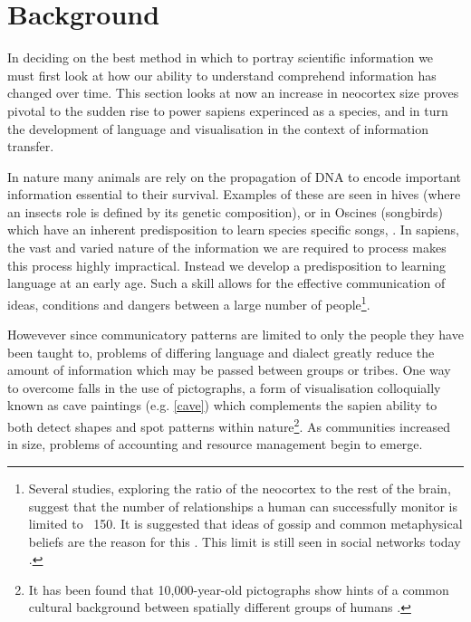 

\section{Background}\label{sec:visbg}

In deciding on the best method in which to portray scientific information we must first look at how our ability to understand comprehend information has changed over time. This section looks at now an increase in neocortex size proves pivotal to the sudden rise to power sapiens experinced as a species, and in turn the development of language and visualisation in the context of information transfer. 

In nature many animals are rely on the propagation of DNA to encode important information essential to their survival. Examples of these are seen in hives (where an insects role is defined by its genetic composition), or in Oscines (songbirds) which have an inherent predisposition to learn species specific songs, \citep{modelingpythonbees,genomics,birds,birdsongs,sapiens}.
In sapiens, the vast and varied nature of the information we are required to process makes this process highly impractical. Instead we develop a predisposition to learning language at an early age. Such a skill allows for the effective communication of ideas, conditions and dangers between a large number of people\footnote{Several studies, exploring the ratio of the neocortex to the rest of the brain, suggest that the number of relationships a human can successfully monitor is limited to ~150. It is suggested that ideas of gossip and common metaphysical beliefs are the reason for this \citep{sapiens,neo,gossip}. This limit is still seen in social networks today \citep{social}.}.

Howevever since communicatory patterns are limited to only the people they have been taught to, problems of differing language and dialect greatly reduce the amount of information which may be passed between groups or tribes. One way to overcome falls in the use of pictographs, a form of visualisation colloquially known as cave paintings (e.g. \autoref{cave}) which complements the sapien ability to both detect shapes and spot patterns within nature\footnote{It has been found that 10,000-year-old pictographs show hints of a common cultural background between spatially different groups of humans \citep{cave}.}. As communities increased in size, problems of accounting and resource management begin to emerge.





